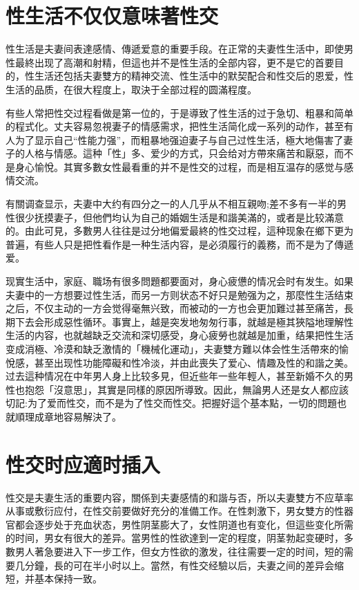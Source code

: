 \documentclass[12pt,UTF8]{ctexbook}
\begin{document}
\section{性生活不仅仅意味著性交}

性生活是夫妻间表達感情、傳遞爱意的重要手段。在正常的夫妻性生活中，即使男性最終出现了高潮和射精，但這也并不是性生活的全部内容，更不是它的首要目的，性生活还包括夫妻雙方的精神交流、性生活中的默契配合和性交后的恩爱，性生活的品质，在很大程度上，取決于全部过程的圆滿程度。

有些人常把性交过程看做是第一位的，于是導致了性生活的过于急切、粗暴和简单的程式化。丈夫容易忽視妻子的情感需求，把性生活简化成一系列的动作，甚至有人为了显示自己“性能力强”，而粗暴地强迫妻子与自己过性生活，極大地傷害了妻子的人格与情感。這种「性」多、爱少的方式，只会给对方帶來痛苦和厭惡，而不是身心愉悅。其實多數女性最看重的并不是性交的过程，而是相互温存的感觉与感情交流。

有關调查显示，夫妻中大约有四分之一的人几乎从不相互親吻;差不多有一半的男性很少抚摸妻子，但他們均认为自己的婚姻生活是和諧美滿的，或者是比较滿意的。由此可見，多數男人往往是过分地偏爱最終的性交过程，這种现象在鄉下更为普遍，有些人只是把性看作是一种生活内容，是必須履行的義務，而不是为了傳遞爱。

现實生活中，家庭、職场有很多問題都要面对，身心疲憊的情况会时有发生。如果夫妻中的一方想要过性生活，而另一方则状态不好只是勉强为之，那麼性生活结束之后，不仅主动的一方会觉得毫無兴致，而被动的一方也会更加難过甚至痛苦，長期下去会形成惡性循环。事實上，越是突发地匆匆行事，就越是極其狹隘地理解性生活的内容，也就越缺乏交流和深切感受，身心疲勞也就越是加重，结果把性生活变成消極、冷漠和缺乏激情的「機械化運动」，夫妻雙方難以体会性生活帶來的愉悅感，甚至出现性功能障礙和性冷淡，并由此喪失了爱心、情趣及性的和諧之美。过去這种情况在中年男人身上比较多見，但近些年一些年輕人，甚至新婚不久的男性也抱怨「沒意思」，其實是同樣的原因所導致。因此，無論男人还是女人都应該切記:为了爱而性交，而不是为了性交而性交。把握好這个基本點，一切的問題也就順理成章地容易解決了。

\section{性交时应適时插入}

性交是夫妻生活的重要内容，關係到夫妻感情的和諧与否，所以夫妻雙方不应草率从事或敷衍应付，在性交前要做好充分的准備工作。在性刺激下，男女雙方的性器官都会逐步处于充血状态，男性阴茎膨大了，女性阴道也有变化，但這些变化所需的时间，男女有很大的差异。當男性的性欲達到一定的程度，阴茎勃起变硬时，多數男人著急要进入下一步工作，但女方性欲的激发，往往需要一定的时间，短的需要几分鐘，長的可在半小时以上。當然，有性交经驗以后，夫妻之间的差异会缩短，并基本保持一致。
\end{document}
